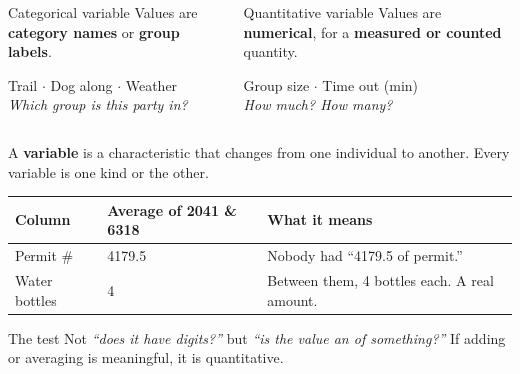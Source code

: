 \documentclass[aspectratio=169, 11pt]{beamer}
\begin{document}
\begin{frame}[t, plain]
  \vspace{2pt}
  \begin{columns}[t]
    \begin{column}{0.47\textwidth}
      \begin{block}{Categorical variable}
        Values are \textbf{category names} or \textbf{group labels}.
      \end{block}
      \vspace{4pt}
      {\small Trail $\cdot$ Dog along $\cdot$ Weather\\[3pt]
      \emph{Which group is this party in?}}
    \end{column}
    \begin{column}{0.47\textwidth}
      \begin{block}{Quantitative variable}
        Values are \textbf{numerical}, for a \textbf{measured or counted} quantity.
      \end{block}
      \vspace{4pt}
      {\small Group size $\cdot$ Time out (min)\\[3pt]
      \emph{How much? How many?}}
    \end{column}
  \end{columns}
  \vspace{12pt}
  \begin{center}
    {\small\color{slate} A \textbf{variable} is a characteristic that changes from one
    individual to another. Every variable is one kind or the other.}
  \end{center}
\end{frame}

\begin{frame}[t, plain]
  \vspace{4pt}
  \renewcommand{\arraystretch}{1.5}
  \begin{tabularx}{\textwidth}{@{} l C{3.6cm} X @{}}
    \hline
    \textbf{Column} & \textbf{Average of 2041 \& 6318} & \textbf{What it means} \\
    \hline
    Permit \#      & 4179.5 &  Nobody had ``4179.5 of permit.'' \\
    Water bottles  & 4      & Between them, 4 bottles each. A real amount. \\
    \hline
  \end{tabularx}
  \vspace{14pt}
  \begin{block}{The test}
    Not \emph{``does it have digits?''} but \emph{``is the value an  of
    something?''} If adding or averaging is meaningful, it is quantitative.
  \end{block}
\end{frame}
\end{document}
